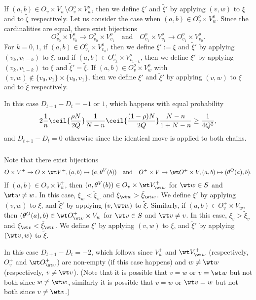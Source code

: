 \documentclass[12pt, reqno]{amsart}
\begin{document}
\subsubsection*{}
If $(a, b) \in O_v \times V_w\setminus O_v^o\times V_w^o$,
then we define $\xi'$ and $\tilde \xi'$ by applying $(v, w)$ to $\xi$ and to $\tilde \xi$ respectively.
Let us consider the case when $(a, b)\in O^o_v\times V^o_w$.
Since the cardinalities are equal, there exist bijections
\[
O_{v_0}^o \times V_{v_0}^o \to O_{v_0}^o\times V_{v_1}^o 
\quad \text{and} \quad
O_{v_1}^o\times V_{v_1}^o \to O_{v_1}^o\times V_{v_0}^o.
\]
For $k=0, 1$,
if $(a, b) \in O_{v_k}^o\times V_{v_k}^o$,
then we define $\xi':=\xi$
and $\tilde \xi'$ by applying $(v_k, v_{1-k})$ to $\tilde \xi$,
and if $(a, b) \in O_{v_k}^o\times V_{v_{1-k}}^o$,
then we define $\xi'$ by applying $(v_k, v_{1-k})$ to $\xi$
and $\tilde \xi'=\tilde \xi$.
If $(a, b) \in O_v^o\times V_w^o$ with $(v, w) \notin \{v_0, v_1\}\times \{v_0, v_1\}$,
then we define $\xi'$ and $\tilde \xi'$ by applying $(v, w)$ to $\xi$ and to $\tilde \xi$ respectively.

In this case $D_{t+1}-D_t=-1$ or $1$,
which happens with equal probability
\[
2\frac{1}{n}\ceil{\frac{\rho N}{2Q}}\frac{1}{N-n}\ceil{\frac{(1-\rho)N}{2Q}}\frac{N-n}{1+N-n}\ge \frac{1}{4Q^2},
\]
and $D_{t+1}-D_t=0$ otherwise since the identical move is applied to both chains.

\subsubsection*{}
Note that there exist bijections
\[
O\times V^+\to O\times \wt V^+, (a, b)\mapsto (a, \theta^V(b))
\quad \text{and} \quad 
O^+\times V \to \wt O^+\times V,
(a, b)\mapsto (\theta^O(a), b).
\]
If $(a, b)\in O_v\times V_w^+$,
then $(a, \theta^V(b)) \in O_v\times \wt V_{\wt w}^+$ for $\wt w \in S$ and $\wt w\neq w$.
In this case, $\xi_w<\tilde \xi_w$ and $\xi_{\wt w}>\tilde \xi_{\wt w}$.
We define $\xi'$ by applying $(v, w)$ to $\xi$,
and $\tilde \xi'$ by applying $(v, \wt w)$ to $\tilde \xi$.
Similarly, if $(a, b) \in O_v^+\times V_w$,
then $(\theta^O(a), b)\in \wt O_{\wt v}^+\times V_w$ for $\wt v \in S$ and $\wt v\neq v$.
In this case, $\xi_v>\tilde \xi_v$ and $\xi_{\wt v}<\tilde \xi_{\wt v}$.
We define $\xi'$ by applying $(v, w)$ to $\xi$,
and $\tilde \xi'$ by applying $(\wt v, w)$ to $\tilde \xi$.

In this case
$D_{t+1}-D_t=-2$,
which follows since $V_w^+$ and $\wt V_{\wt w}^+$ (respectively, $O_v^+$ and $\wt O_{\wt v}^+$) are non-empty (if this case happens) and $w \neq \wt w$ (respectively, $v \neq \wt v$).
(Note that it is possible that $v=w$ or $v=\wt w$ but not both since $w \neq \wt w$,
similarly it is possible that $v=w$ or $\wt v=w$ but not both since $v\neq \wt v$.)
\end{document}
